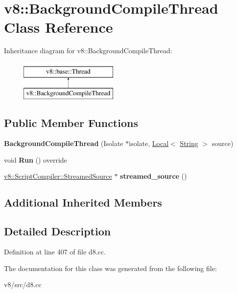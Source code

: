 \hypertarget{classv8_1_1BackgroundCompileThread}{}\section{v8\+:\+:Background\+Compile\+Thread Class Reference}
\label{classv8_1_1BackgroundCompileThread}
Inheritance diagram for v8\+:\+:Background\+Compile\+Thread\+:\begin{figure}[H]
\begin{center}
\leavevmode
\includegraphics[height=2.000000cm]{classv8_1_1BackgroundCompileThread}
\end{center}
\end{figure}
\subsection*{Public Member Functions}
\begin{DoxyCompactItemize}
\item 
\mbox{\label{classv8_1_1BackgroundCompileThread_a6fb69303f2e7191b02ca87c8390c7e69}} 
{\bfseries Background\+Compile\+Thread} (Isolate $\ast$isolate, \mbox{\hyperlink{classv8_1_1Local}{Local}}$<$ \mbox{\hyperlink{classv8_1_1String}{String}} $>$ source)
\item 
\mbox{\label{classv8_1_1BackgroundCompileThread_a157c29db82ca70cbf8540176b42436ec}} 
void {\bfseries Run} () override
\item 
\mbox{\label{classv8_1_1BackgroundCompileThread_a7b5cf1c0e11248a10590cc9f055b252e}} 
\mbox{\hyperlink{classv8_1_1ScriptCompiler_1_1StreamedSource}{v8\+::\+Script\+Compiler\+::\+Streamed\+Source}} $\ast$ {\bfseries streamed\+\_\+source} ()
\end{DoxyCompactItemize}
\subsection*{Additional Inherited Members}


\subsection{Detailed Description}


Definition at line 407 of file d8.\+cc.



The documentation for this class was generated from the following file\+:\begin{DoxyCompactItemize}
\item 
v8/src/d8.\+cc\end{DoxyCompactItemize}
